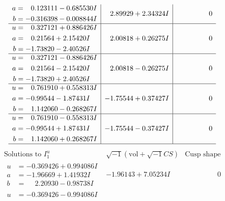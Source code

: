 \documentclass[1p]{elsarticle_modified}
\theoremstyle{definition}
\newcommand{\I}{\sqrt{-1}}
\begin{document}
$$\begin{array}{c|c|c}
\begin{aligned}
a &= \phantom{-}0.123111 - 0.685530 I \\
b &= -0.316398 - 0.008844 I\end{aligned}
 & \phantom{-}2.89929 + 2.34324 I & \phantom{-0.000000 } 0 \\ \hline\begin{aligned}
u &= \phantom{-}0.327121 + 0.886426 I \\
a &= \phantom{-}0.21564 + 2.15420 I \\
b &= -1.73820 - 2.40526 I\end{aligned}
 & \phantom{-}2.00818 + 0.26275 I & \phantom{-0.000000 } 0 \\ \hline\begin{aligned}
u &= \phantom{-}0.327121 - 0.886426 I \\
a &= \phantom{-}0.21564 - 2.15420 I \\
b &= -1.73820 + 2.40526 I\end{aligned}
 & \phantom{-}2.00818 - 0.26275 I & \phantom{-0.000000 } 0 \\ \hline\begin{aligned}
u &= \phantom{-}0.761910 + 0.558313 I \\
a &= -0.99544 - 1.87431 I \\
b &= \phantom{-}1.142060 - 0.268267 I\end{aligned}
 & -1.75544 + 0.37427 I & \phantom{-0.000000 } 0 \\ \hline\begin{aligned}
u &= \phantom{-}0.761910 - 0.558313 I \\
a &= -0.99544 + 1.87431 I \\
b &= \phantom{-}1.142060 + 0.268267 I\end{aligned}
 & -1.75544 - 0.37427 I & \phantom{-0.000000 } 0\\
 \hline 
 \end{array}$$\newpage$$\begin{array}{c|c|c}  
\text{Solutions to }I^u_{1}& \I (\text{vol} + \sqrt{-1}CS) & \text{Cusp shape}\\
 \hline 
\begin{aligned}
u &= -0.369426 + 0.994086 I \\
a &= -1.96669 + 1.41932 I \\
b &= \phantom{-}2.20930 - 0.98738 I\end{aligned}
 & -1.96143 + 7.05234 I & \phantom{-0.000000 } 0 \\ \hline\begin{aligned}
u &= -0.369426 - 0.994086 I \\

\end{aligned}
\end{array}$$
\end{document}
